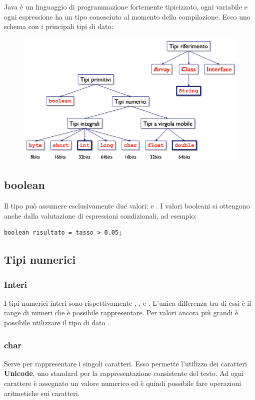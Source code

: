 \documentclass[../main.tex]{subfiles}
\begin{document}
Java è un linguaggio di programmazione fortemente tipicizzato, ogni variabile e ogni espressione ha un tipo conosciuto al momento 
della compilazione. Ecco uno schema con i principali tipi di dato:
\begin{figure}[h]
    \centering
    \includegraphics[width=1\textwidth]{../images/tipiDato.png}
\end{figure}

\subsection{boolean}
Il tipo  può assumere esclusivamente due valori:  e . I valori booleani si ottengono anche dalla
valutazione di espressioni condizionali, ad esempio:
\begin{lstlisting}[style=java]
    boolean risultato = tasso > 0.05;
\end{lstlisting}

\subsection{Tipi numerici}
\subsubsection{Interi}
I tipi numerici interi sono rispettivamente , ,  e . L'unica differenza tra di essi
è il range di numeri che è possibile rappresentare. Per valori ancora più grandi è possibile utilizzare il tipo di dato
.

\subsubsection{char}
Serve per rappresentare i singoli caratteri. Esso permette l'utilizzo dei caratteri \textbf{Unicode}, uno standard per la rappresentazione
consistente del testo. Ad ogni carattere è assegnato un valore numerico ed è quindi possibile fare operazioni aritmetiche sui caratteri.
\end{document}
